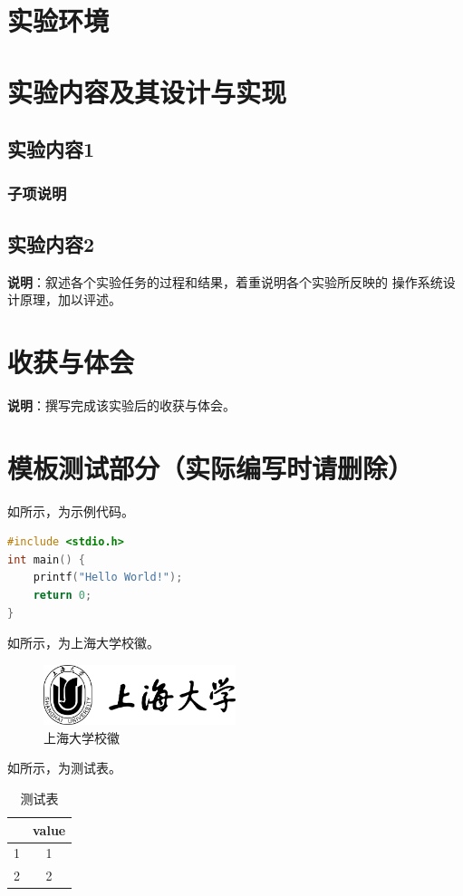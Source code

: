 \documentclass[lang=cn,a4paper,chinesefont=founder]{shu-lab-report}
\begin{document}
\section{实验环境}

\section{实验内容及其设计与实现}

\subsection{实验内容1}

\subsubsection{子项说明}

\subsection{实验内容2}

\textbf{说明}：叙述各个实验任务的过程和结果，着重说明各个实验所反映的
操作系统设计原理，加以评述。

\section{收获与体会}

\textbf{说明}：撰写完成该实验后的收获与体会。

\section{模板测试部分（实际编写时请删除）}

如所示，为示例代码。

\begin{lstlisting}[language=C, caption={示例代码}, label={code:example}]
#include <stdio.h>
int main() {
    printf("Hello World!");
    return 0;
}
\end{lstlisting}


如所示，为上海大学校徽。

\begin{figure}[!htbp]
    \centering
    \includegraphics[width=0.5\textwidth]{image/shulogo.png}
    \caption{上海大学校徽}
    \label{fig:example}
\end{figure}

如所示，为测试表。

\begin{table}[!htbp]
    \caption{测试表}
    \label{tab:example}
    \centering
    \begin{tabular}{cc}
        \toprule
            & value\\
        \midrule
        1   & 1     \\
        2   & 2     \\
        \bottomrule
    \end{tabular}
\end{table}
\end{document}
